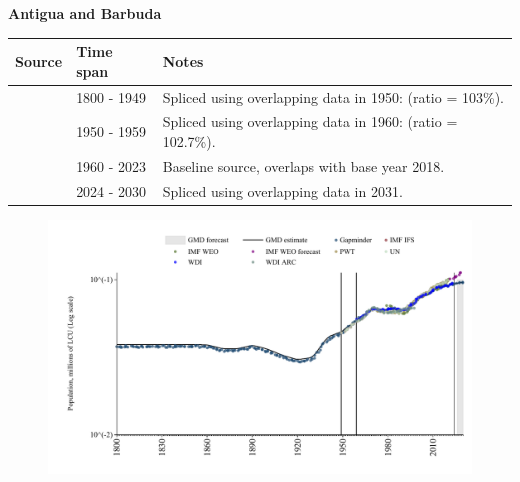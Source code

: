 \documentclass[12pt,a4paper,landscape]{article}
\begin{document}
\begin{adjustbox}{max totalsize={\paperwidth}{\paperheight},center}
\begin{minipage}[t][\textheight][t]{\textwidth}
\vspace*{0.5cm}
{}
\begin{center}
{\Large\bfseries Antigua and Barbuda}
\end{center}
\vspace{0.5cm}
\begin{table}[H]
\centering
\small
\begin{tabular}{|l|l|l|}
\hline
\textbf{Source} & \textbf{Time span} & \textbf{Notes} \\
\hline
\rowcolor{white}\cite{Gapminder}& 1800 - 1949 &Spliced using overlapping data in 1950: (ratio = 103\%).\\
\rowcolor{lightgray}\cite{IMF_IFS}& 1950 - 1959 &Spliced using overlapping data in 1960: (ratio = 102.7\%).\\
\rowcolor{white}\cite{WDI}& 1960 - 2023 &Baseline source, overlaps with base year 2018.\\
\rowcolor{lightgray}\cite{Gapminder}& 2024 - 2030 &Spliced using overlapping data in 2031.\\
\hline
\end{tabular}
\end{table}
\begin{figure}[H]
\centering
\includegraphics[width=\textwidth,height=0.6\textheight,keepaspectratio]{graphs/ATG_pop.pdf}
\end{figure}
\end{minipage}
\end{adjustbox}
\end{document}
